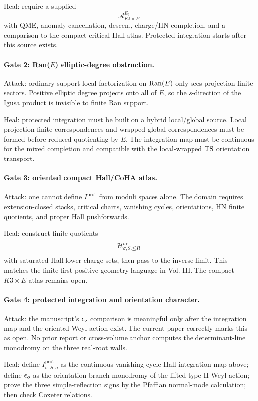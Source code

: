 Heal: require a supplied
\[
  \mathcal A^{E_3}_{K3\times E}
\]
with QME, anomaly cancellation, descent, charge/HN completion, and a
comparison to the compact critical Hall atlas.  Protected integration
starts after this source exists.

\paragraph{Gate 2: Ran(\(E\)) elliptic-degree obstruction.}
Attack: ordinary support-local factorization on \(\operatorname{Ran}(E)\) only sees
projection-finite sectors.  Positive elliptic degree projects onto all
of \(E\), so the \(s\)-direction of the Igusa product is invisible to
finite Ran support.

Heal: protected integration must be built on a hybrid local/global
source.  Local projection-finite correspondences and wrapped global
correspondences must be formed before reduced quotienting by \(E\).  The
integration map must be continuous for the mixed completion and
compatible with the local-wrapped \(\mathrm{TS}\) orientation transport.

\paragraph{Gate 3: oriented compact Hall/CoHA atlas.}
Attack: one cannot define \(I^{\mathrm{prot}}\) from moduli spaces
alone.  The domain requires extension-closed stacks, critical charts,
vanishing cycles, orientations, HN finite quotients, and proper Hall
pushforwards.

Heal: construct finite quotients
\[
  \mathcal H^{\mathrm{or}}_{\sigma,S,\le R}
\]
with saturated Hall-lower charge sets, then pass to the inverse limit.
This matches the finite-first positive-geometry language in Vol. III.
The compact \(K3\times E\) atlas remains open.

\paragraph{Gate 4: protected integration and orientation character.}
Attack: the manuscript's \(\epsilon_o\) comparison is meaningful only after
the integration map and the oriented Weyl action exist.  The current
paper correctly marks this as open.  No prior report or cross-volume
anchor computes the determinant-line monodromy on the three real-root
walls.

Heal: define \(I^{\mathrm{prot}}_{\sigma,S,o}\) as the continuous
vanishing-cycle Hall integration map above; define \(\epsilon_o\) as the
orientation-branch monodromy of the lifted type-II Weyl action; prove
the three simple-reflection signs by the Pfaffian normal-mode
calculation; then check Coxeter relations.

